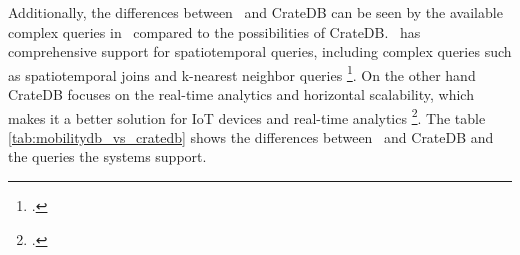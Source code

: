 Additionally, the differences between \mobilitydbc~and CrateDB can be seen by the available complex queries in \mobilitydbc~compared to the possibilities of CrateDB.
\mobilitydbc~has comprehensive support for spatiotemporal queries, including complex queries such as spatiotemporal joins and k-nearest neighbor queries \parencite{bakliDistributedSpatiotemporalTrajectory2020} \footcite{QueryingDataMobilitydbDocs}.
On the other hand CrateDB focuses on the real-time analytics and horizontal scalability, which makes it a better solution for IoT devices and real-time analytics \footcite{CrateDBDocumentation}.
The table \ref{tab:mobilitydb_vs_cratedb} shows the differences between \mobilitydbc~and CrateDB and the queries the systems support.
